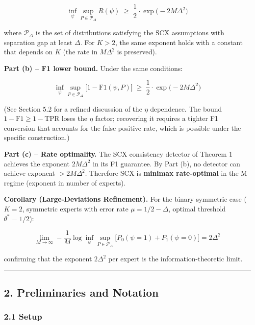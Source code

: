 \documentclass[
  12pt,
]{article}
\begin{document}
\[\inf_{\psi} \sup_{P \in \mathcal{P}_{\Delta}} R(\psi) \;\geq\; \frac{1}{2} \cdot \exp\!\bigl(-2M\Delta^2\bigr)\]

where \(\mathcal{P}_{\Delta}\) is the set of distributions satisfying
the SCX assumptions with separation gap at least \(\Delta\). For
\(K > 2\), the same exponent holds with a constant that depends on \(K\)
(the rate in \(M\Delta^2\) is preserved).

\textbf{Part (b) -- F1 lower bound.} Under the same conditions:

\[\inf_{\psi} \sup_{P \in \mathcal{P}_{\Delta}} \bigl[1 - \text{F1}(\psi, P)\bigr] \;\geq\; \frac{1}{2} \cdot \exp\!\bigl(-2M\Delta^2\bigr)\]

(See Section 5.2 for a refined discussion of the \(\eta\) dependence.
The bound \(1-\text{F1} \geq 1-\text{TPR}\) loses the \(\eta\) factor;
recovering it requires a tighter F1 conversion that accounts for the
false positive rate, which is possible under the specific construction.)

\textbf{Part (c) -- Rate optimality.} The SCX consistency detector of
Theorem 1 achieves the exponent \(2M\Delta^2\) in its F1 guarantee. By
Part (b), no detector can achieve exponent \(> 2M\Delta^2\). Therefore
SCX is \textbf{minimax rate-optimal} in the M-regime (exponent in number
of experts).

\textbf{Corollary (Large-Deviations Refinement).} For the binary
symmetric case (\(K=2\), symmetric experts with error rate
\(\mu = 1/2 - \Delta\), optimal threshold \(\theta^* = 1/2\)):

\[\lim_{M \to \infty} -\frac{1}{M} \log \inf_{\psi} \sup_{P \in \mathcal{P}_{\Delta}} \bigl[P_0(\psi=1) + P_1(\psi=0)\bigr] = 2\Delta^2\]

confirming that the exponent \(2\Delta^2\) per expert is the
information-theoretic limit.

\begin{center}\rule{0.5\linewidth}{0.5pt}\end{center}

\subsection{2. Preliminaries and
Notation}\label{preliminaries-and-notation}

\subsubsection{2.1 Setup}\label{setup}
\end{document}
